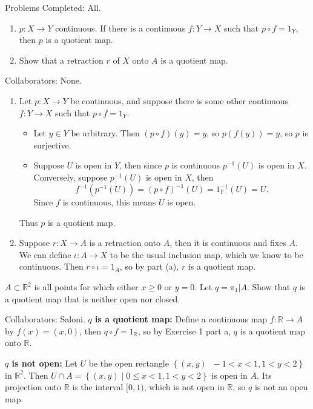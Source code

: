 \documentclass[10pt]{report}
\begin{document}

{\color{blue}Problems Completed: All.}

\begin{exer}[\S 22, \#2]
\begin{enumerate}
	\item $p:X\to Y$ continuous. If there is a continuous $f:Y\to X$ such that $p \circ f = 1_{Y}$, then $p$ is a quotient map.
	\item Show that a retraction $r$ of $X$ onto $A$ is a quotient map.
\end{enumerate}
\end{exer}
{\color{blue}Collaborators: None.}
\begin{enumerate}
	\item Let $p:X\to Y$ be continuous, and suppose there is some other continuous $f:Y\to X$ such that $p\circ f=1_{Y}$.
		\begin{itemize}
			\item Let $y \in Y$ be arbitrary. Then $(p\circ f)(y) = y$, so $p(f(y))=y$, so $p$ is surjective.
			\item Suppose $U$ is open in $Y$, then since $p$ is continuous $p^{-1}(U)$ is open in $X$. Conversely, suppose $p^{-1}(U)$ is open in $X$, then
				\[
					f^{-1}(p^{-1}(U)) = (p\circ f)^{-1}(U) = 1_{Y}^{-1}(U) = U.
				\] Since $f$ is continuous, this means $U$ is open.
		\end{itemize}
		Thus $p$ is a quotient map.
	\item Suppose $r:X\to A$ is a retraction onto $A$, then it is continuous and fixes $A$. We can define $\iota:A\to X$ to be the usual inclusion map, which we know to be continuous. Then $r \circ \iota = 1_{A}$, so by part (a), $r$ is a quotient map.
\end{enumerate}

\pagebreak
\begin{exer}[\S 22, \#3]
$A \subset \mathbb{R}^2$ is all points for which either $x \geq 0$ or $y=0$. Let $q = \pi_{1}|A$. Show that $q$ is a quotient map that is neither open nor closed.
\end{exer}
{\color{blue}Collaborators: Saloni.}
\textbf{$q$ is a quotient map:} Define a continuous map $f:\mathbb{R}\to A$ by $f(x)=(x,0)$, then $q\circ f = 1_\mathbb{R}$, so by Exercise 1 part a, $q$ is a quotient map onto $\mathbb{R}$.

\textbf{$q$ is not open:} Let $U$ be the open rectangle $\left\{ (x,y) \;\; -1<x<1, 1<y<2 \right\}$ in $\mathbb{R}^2$. Then $U \cap A = \left\{ (x,y) \;|\; 0\leq x < 1, 1 < y < 2 \right\}$ is open in $A$. Its projection onto $\mathbb{R}$ is the interval $[0,1)$, which is not open in $\mathbb{R}$, so $q$ is not an open map.
\end{document}
